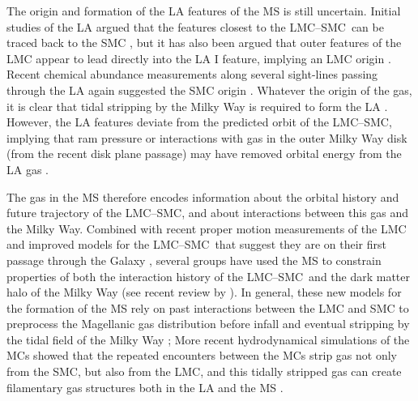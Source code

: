 \documentclass[twocolumn]{aastex62}
\newcommand{\lmcsmc}{LMC--SMC}
\begin{document}
The origin and formation of the LA features of the MS is still uncertain.
Initial studies of the LA argued that the features closest to the \lmcsmc\ can be traced back to the SMC \citep{Putman:1998}, but it has also been argued that outer features of the LMC appear to lead directly into the LA I feature, implying an LMC origin \citep{Nidever:2008}.
Recent chemical abundance measurements along several sight-lines passing through the LA again suggested the SMC origin \citep{Fox:2018, Richter:2018}.
Whatever the origin of the gas, it is clear that tidal stripping by the Milky Way is required to form the LA \citep{Nidever:2008, Besla:2012}.
However, the LA features deviate from the predicted orbit of the \lmcsmc, implying that ram pressure or interactions with gas in the outer Milky Way disk (from the recent disk plane passage) may have removed orbital energy from the LA gas \citep[e.g.,][]{Bekki:2008}.

The gas in the MS therefore encodes information about the orbital history and future trajectory of the \lmcsmc, and about interactions between this gas and the Milky Way.
Combined with recent proper motion measurements of the LMC \citep{Kallivayalil:2006, Kallivayalil:2013} and improved models for the \lmcsmc\ that suggest they are on their first passage through the Galaxy \citep{Besla:2007, Besla:2010, Besla:2012}, several groups have used the MS to constrain properties of both the interaction history of the \lmcsmc\ and the dark matter halo of the Milky Way (see recent review by \citealt{DOnghia:2016}).
In general, these new models for the formation of the MS rely on past interactions between the LMC and SMC to preprocess the Magellanic gas distribution before infall and eventual stripping by the tidal field of the Milky Way \citep{Besla:2012, Diaz:2012};
More recent hydrodynamical simulations of the MCs showed that the repeated encounters between the MCs strip gas not only from the SMC, but also from the LMC, and this tidally stripped gas can create filamentary gas structures both in the LA and the MS \citep{Pardy:2018}.
\end{document}
